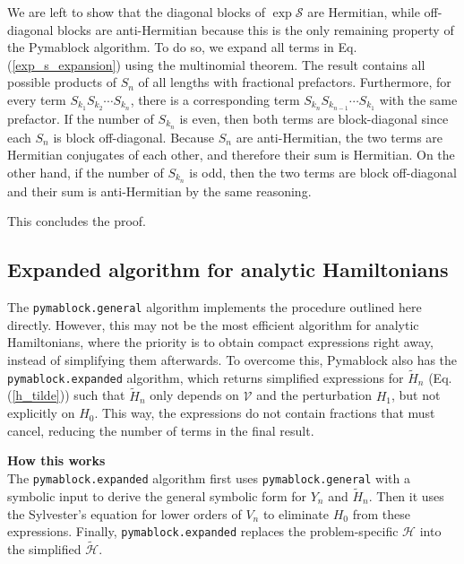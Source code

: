 \documentclass[submission, Codebases]{SciPost}
\begin{document}
{{We are left to show that the diagonal blocks of $\exp \mathcal{S}$ are
Hermitian, while off-diagonal blocks are anti-Hermitian because this is the
only remaining property of the Pymablock algorithm.
To do so, we expand all terms in Eq. (\ref{exp_s_expansion}) using the multinomial theorem.
The result contains all possible products of $S_n$ of all lengths with fractional prefactors.
Furthermore, for every term $S_{k_1}S_{k_2}\cdots S_{k_n}$, there is a
corresponding term $S_{k_n}S_{k_{n -1}}\cdots S_{k_1}$ with the same prefactor.
If the number of $S_{k_n}$ is even, then both terms are block-diagonal since
each $S_n$ is block off-diagonal.
Because $S_n$ are anti-Hermitian, the two terms are Hermitian conjugates of each
other, and therefore their sum is Hermitian.
On the other hand, if the number of $S_{k_n}$ is odd, then the two terms are
block off-diagonal and their sum is anti-Hermitian by the same reasoning.

This concludes the proof.

\subsection{Expanded algorithm for analytic Hamiltonians}

The \texttt{pymablock.general} algorithm implements the procedure outlined here directly.
However, this may not be the most efficient algorithm for analytic Hamiltonians,
where the priority is to obtain compact expressions right away, instead of
simplifying them afterwards.
To overcome this, Pymablock also has the \texttt{pymablock.expanded} algorithm, which
returns simplified expressions for $\tilde{H}_{n}$ (Eq. (\ref{h_tilde})) such
that $\tilde{H}_{n}$ only depends on $\mathcal{V}$ and the perturbation $H_1$, but not
explicitly on $H_0$.
This way, the expressions do not contain fractions that must cancel, reducing
the number of terms in the final result.

\begin{framed}
\textbf{How this works}\\
The \texttt{pymablock.expanded} algorithm first uses
\texttt{pymablock.general} with a symbolic input to derive the general
symbolic form for $Y_n$ and $\tilde{H}_n$.
Then it uses the Sylvester's equation for lower orders of $V_n$ to eliminate
$H_0$ from these expressions.
Finally, \texttt{pymablock.expanded} replaces the problem-specific $\mathcal{H}$ into
the simplified $\tilde{\mathcal{H}}$.
\end{framed}

}}
\end{document}
